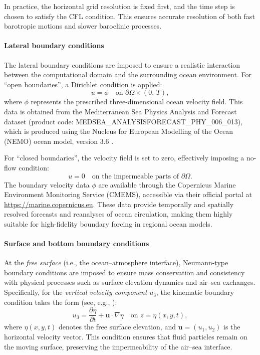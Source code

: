 \documentclass[a4paper,12pt,reqno,natbib]{amsart}
\begin{document}
In practice, the horizontal grid resolution is fixed first, and the time step is chosen to satisfy the CFL condition. This ensures accurate resolution of both fast barotropic motions and slower baroclinic processes.

\vspace{0.3cm}
\paragraph{\bf{Lateral boundary conditions}} The lateral boundary conditions are imposed to ensure a realistic interaction between the computational domain and the surrounding ocean environment. For ``open boundaries'', a Dirichlet condition is applied:
\[
u = \phi \quad \text{on } \partial\Omega \times (0,\,T),
\]
where \( \phi \) represents the prescribed three-dimensional ocean velocity field. This data is obtained from the Mediterranean Sea Physics Analysis and Forecast dataset (product code: MEDSEA\_ANALYSISFORECAST\_PHY\_006\_013), which is produced using the Nucleus for European Modelling of the Ocean (NEMO) ocean model, version 3.6 \cite{NEMO}.

\noindent For ``closed boundaries'', the velocity field is set to zero, effectively imposing a no-flow condition:
\[
u = 0 \quad \text{on the impermeable parts of } \partial\Omega.
\]
The boundary velocity data \( \phi \) are available through the Copernicus Marine Environment Monitoring Service (CMEMS), accessible via their official portal at \url{https://marine.copernicus.eu}. These data provide temporally and spatially resolved forecasts and reanalyses of ocean circulation, making them highly suitable for high-fidelity boundary forcing in regional ocean models.

\vspace{0.3cm}
\paragraph{\bf Surface and bottom boundary conditions}

At the \emph{free surface} (i.e., the ocean--atmosphere interface), Neumann-type boundary conditions are imposed to ensure mass conservation and consistency with physical processes such as surface elevation dynamics and air--sea exchanges. Specifically, for the \emph{vertical velocity component} \( u_3 \), the kinematic boundary condition takes the form (see, e.g., \cite{mellor87}):
\[
u_3 = \frac{\partial \eta}{\partial t} + \mathbf{u} \cdot \nabla \eta \quad \text{on } z = \eta(x, y, t),
\]
where \( \eta(x, y, t) \) denotes the free surface elevation, and \( \mathbf{u} = (u_1, u_2) \) is the horizontal velocity vector. This condition ensures that fluid particles remain on the moving surface, preserving the impermeability of the air–sea interface.
\end{document}

